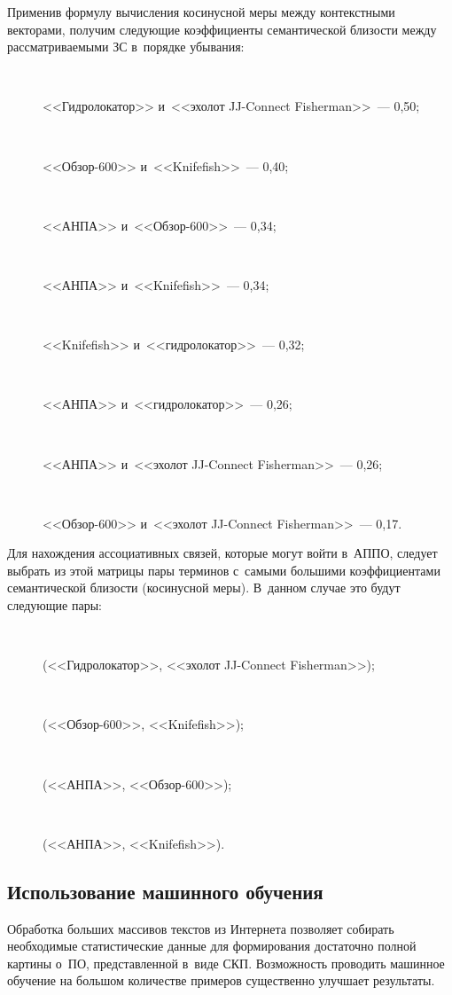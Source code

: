 \begin{multicols}{2}
     Применив формулу вычисления косинусной меры между
контекстными векторами, получим следующие коэффициенты
семантической бли\-зости между рассматриваемыми ЗС в~порядке убывания:
\begin{description}
\item[\,]
     <<Гидролокатор>> и~<<эхолот JJ-Connect Fisherman>>~--- 0,50;
\item[\,]
     <<Обзор-600>> и~<<Knifefish>>~--- 0,40;
\item[\,]
     <<АНПА>> и~<<Обзор-600>>~--- 0,34;
\item[\,]
     <<АНПА>> и~<<Knifefish>>~--- 0,34;
\item[\,]
     <<Knifefish>> и~<<гидролокатор>>~--- 0,32;
\item[\,]
     <<АНПА>> и~<<гидролокатор>>~--- 0,26;
\item[\,]
     <<АНПА>> и~<<эхолот JJ-Connect Fisherman>>~--- 0,26;
\item[\,]
     <<Обзор-600>> и~<<эхолот JJ-Connect Fisherman>>~--- 0,17.
\end{description}

     Для нахождения ассоциативных связей, которые могут войти в~АППО, следует выбрать из этой матрицы пары
терминов с~самыми большими коэффициентами семантической близости
(косинусной меры). В~данном случае это будут следующие пары:
\begin{description}
\item[\,]     (<<Гидролокатор>>, <<эхолот JJ-Connect Fisherman>>);
\item[\,]
     (<<Обзор-600>>, <<Knifefish>>);
\item[\,]
     (<<АНПА>>, <<Обзор-600>>);
     \item[\,]
     (<<АНПА>>, <<Knifefish>>).
     \end{description}

     \subsection{Использование машинного обучения}

     Обработка больших массивов текстов из Интернета позволяет
собирать необходимые статистические данные для формирования достаточно
полной картины о~ПО, представленной в~виде СКП.
Возможность проводить машинное обучение на большом количестве
примеров существенно улучшает результаты.


\end{multicols}
